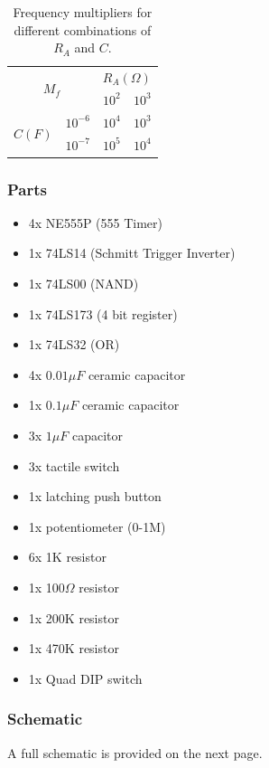 \begin{table}[H]
  \centering
  \setlength\extrarowheight{5pt}
  \begin{tabular}{cc|cc}
    \multicolumn{2}{c|}{\multirow{2}{*}{$M_f$}} & \multicolumn{2}{c}{$R_A(\Omega)$} \\
                            &          &  $10^2$  & $10^3$ \\ \hline
    \multirow{2}{*}{$C(F)$} & $10^{-6}$ &  $10^4$  & $10^3$ \\
                            & $10^{-7}$ &  $10^5$  & $10^4$ \\
  \end{tabular}
  \caption{Frequency multipliers for different combinations of $R_A$ and $C$.}
  \label{tab:fmultipliers}
\end{table}



\subsubsection*{Parts}
\begin{multicols}{2}
\begin{itemize}\itemsep0em
\item 4x NE555P (555 Timer)
\item 1x 74LS14 (Schmitt Trigger Inverter)
\item 1x 74LS00 (NAND)
\item 1x 74LS173 (4 bit register)
\item 1x 74LS32 (OR)
\item 4x $0.01\mu F$ ceramic capacitor
\item 1x $0.1\mu F$ ceramic capacitor
\item 3x $1\mu F$ capacitor
\item 3x tactile switch
\item 1x latching push button
\item 1x potentiometer (0-1M)
\item 6x 1K resistor
\item 1x 100$\Omega$ resistor
\item 1x 200K resistor
\item 1x 470K resistor
\item 1x Quad DIP switch
\end{itemize}
\end{multicols}

\subsubsection*{Schematic}
A full schematic is provided on the next page.


